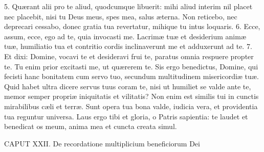 5. Quærant alii pro te aliud, quodcumque libuerit: mihi aliud interim nil placet nec placebit, nisi tu Deus meus, spes mea, salus æterna. Non reticebo, nec deprecari cessabo, donec gratia tua revertatur, mihique tu intus loquaris.
6. Ecce, assum, ecce, ego ad te, quia invocasti me. Lacrimæ tuæ et desiderium animæ tuæ, humiliatio tua et contritio cordis inclinaverunt me et adduxerunt ad te.
7. Et dixi: Domine, vocavi te et desideravi frui te, paratus omnia respuere propter te. Tu enim prior excitasti me, ut quærerem te. Sis ergo benedictus, Domine, qui fecisti hanc bonitatem cum servo tuo, secundum multitudinem misericordiæ tuæ. Quid habet ultra dicere servus tuus coram te, nisi ut humiliet se valde ante te, memor semper propriæ iniquitatis et vilitatis? Non enim est similis tui in cunctis mirabilibus cæli et terræ. Sunt opera tua bona valde, iudicia vera, et providentia tua reguntur universa. Laus ergo tibi et gloria, o Patris sapientia: te laudet et benedicat os meum, anima mea et cuncta creata simul.


CAPUT XXII.
De recordatione multiplicium beneficiorum Dei


